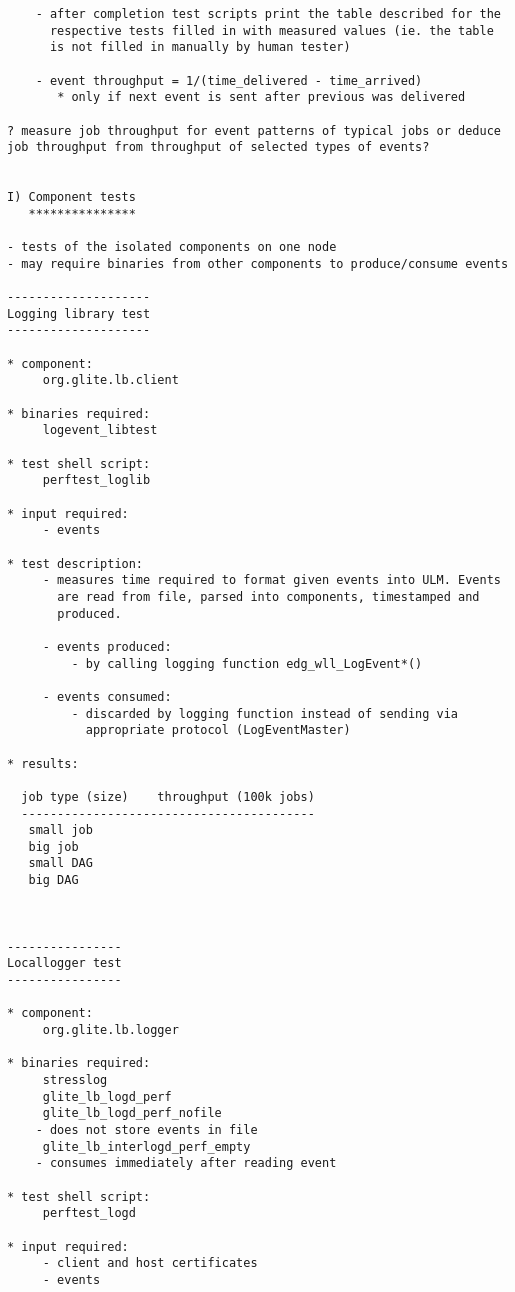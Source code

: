 \documentclass{egee}
\begin{document}
\begin{verbatim}
    - after completion test scripts print the table described for the
      respective tests filled in with measured values (ie. the table
      is not filled in manually by human tester)
 
    - event throughput = 1/(time_delivered - time_arrived)
       * only if next event is sent after previous was delivered

? measure job throughput for event patterns of typical jobs or deduce
job throughput from throughput of selected types of events?


I) Component tests 
   ***************

- tests of the isolated components on one node
- may require binaries from other components to produce/consume events

--------------------
Logging library test
--------------------

* component:  
     org.glite.lb.client

* binaries required: 
     logevent_libtest

* test shell script:
     perftest_loglib

* input required:
     - events

* test description:
     - measures time required to format given events into ULM. Events
       are read from file, parsed into components, timestamped and
       produced. 

     - events produced:
         - by calling logging function edg_wll_LogEvent*()

     - events consumed:
         - discarded by logging function instead of sending via
           appropriate protocol (LogEventMaster)

* results:

  job type (size)    throughput (100k jobs)
  -----------------------------------------
   small job
   big job
   small DAG
   big DAG



----------------
Locallogger test
----------------

* component:
     org.glite.lb.logger

* binaries required:
     stresslog
     glite_lb_logd_perf
     glite_lb_logd_perf_nofile
	- does not store events in file
     glite_lb_interlogd_perf_empty
	- consumes immediately after reading event

* test shell script:
     perftest_logd

* input required:
     - client and host certificates
     - events


\end{verbatim}
\end{document}
